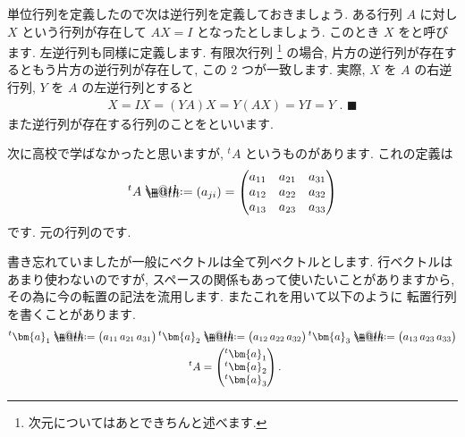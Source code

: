 \documentclass[openany, a4paper, oneside]{book}
\makeatletter
\newcommand*{\defeq}{\mathrel{\rlap{%
\raisebox{0.3ex}{$\m@th\cdot$}}%
\raisebox{-0.3ex}{$\m@th\cdot$}}%
=}
\theoremstyle{break}
\theoremstyle{breakdefn}
\makeatother
\begin{document}
単位行列を定義したので次は逆行列を定義しておきましょう.
ある行列 $A$ に対し $X$ という行列が存在して $AX = I$ となったとしましょう. このとき $X$ をと呼びます.
左逆行列も同様に定義します. 有限次行列 \footnote{次元についてはあとできちんと述べます.
 }
の場合, 片方の逆行列が存在するともう片方の逆行列が存在して, この 2 つが一致します.
実際,  $X$ を $A$ の右逆行列,  $Y$ を $A$ の左逆行列とすると
    \begin{align}
        X = IX = (YA) X = Y (AX) = YI = Y \,\, . \,\, \blacksquare
    \end{align}
また逆行列が存在する行列のことをといいます.

次に高校で学ばなかったと思いますが,  ${^t}A$ というものがあります. これの定義は
    \begin{align}
        {^t}A \defeq (a_{ji})
        = \begin{pmatrix}
            a_{11} & a_{21} & a_{31} \\
            a_{12} & a_{22} & a_{32} \\
            a_{13} & a_{23} & a_{33}
        \end{pmatrix}
    \end{align}
です. 元の行列のです.

書き忘れていましたが一般にベクトルは全て列ベクトルとします. 行ベクトルはあまり使わないのですが,
スペースの関係もあって使いたいことがありますから, その為に今の転置の記法を流用します. またこれを用いて以下のように
転置行列を書くことがあります.
    \begin{align}
        {^t}\bm{a}_{1} \defeq \begin{pmatrix}  a_{11} \, a_{21} \, a_{31} \end{pmatrix}
        {^t}\bm{a}_{2} &\defeq \begin{pmatrix}  a_{12} \, a_{22} \, a_{32} \end{pmatrix}
        {^t}\bm{a}_{3} \defeq \begin{pmatrix}  a_{13} \, a_{23} \, a_{33} \end{pmatrix} \\
        {^t}A &= \begin{pmatrix} {^t}\bm{a}_{1} \\ {^t}\bm{a}_{2} \\ {^t}\bm{a}_{3}\end{pmatrix} .
    \end{align}
\end{document}
